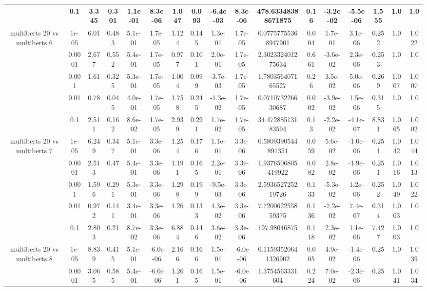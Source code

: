 \begin{tabular}{|c|c|c|c|c|c|c|c|c|c|c|c|c|c|c|c|c|}
 & 0.1 & 3.345 & 0.301 & 1.1e-01 & 8.3e-06 & 1.047 & 0.093 & -6.4e-03 & 8.3e-06 & 478.63348388671875 & 0.16 & -3.2e-02 & -5.5e-06 & 1.555 & 1.0 & 1.0 \\
\hline
\multirow{5}{*}{multiberts 20 vs multiberts 6} & 1e-05 & 6.01 & 0.483 & 5.1e-01 & 1.7e-05 & 1.124 & 0.145 & 1.3e-01 & 1.7e-05 & 0.07757755368947901 & 0.004 & 1.7e-01 & 3.1e-06 & 0.252 & 1.0 & 1.022 \\
 & 0.0001 & 2.677 & 0.552 & 5.4e-01 & 1.7e-05 & 0.977 & 0.101 & 2.0e-01 & 1.7e-05 & 2.302332401275634 & 0.661 & -3.6e-02 & 2.3e-06 & 0.253 & 1.0 & 1.0 \\
 & 0.001 & 1.61 & 0.325 & 5.3e-01 & 1.7e-05 & 1.004 & 0.099 & -3.7e-03 & 1.7e-05 & 1.780356407165527 & 0.26 & 3.5e-02 & 5.0e-06 & 0.269 & 1.007 & 1.007 \\
 & 0.01 & 0.78 & 0.045 & 4.0e-01 & 1.7e-05 & 1.758 & 0.245 & -1.3e-02 & 1.7e-05 & 0.071073226630687 & 0.002 & -3.9e-02 & 1.5e-06 & 0.315 & 1.0 & 1.0 \\
 & 0.1 & 2.511 & 0.162 & 8.6e-02 & 1.7e-05 & 2.939 & 0.291 & 1.7e-02 & 1.7e-05 & 34.47288513183594 & 0.13 & -2.2e-02 & -4.1e-07 & 8.831 & 1.065 & 1.002 \\
\hline
\multirow{5}{*}{multiberts 20 vs multiberts 7} & 1e-05 & 6.249 & 0.347 & 5.1e-01 & 3.3e-06 & 1.254 & 0.176 & 1.1e-01 & 3.3e-06 & 0.5809390544891351 & 0.059 & 5.6e-02 & -1.0e-06 & 0.251 & 1.042 & 1.044 \\
 & 0.0001 & 2.513 & 0.47 & 5.4e-01 & 3.3e-06 & 1.191 & 0.165 & 2.2e-01 & 3.3e-06 & 1.9376506805419922 & 0.082 & 2.8e-02 & -1.9e-06 & 0.251 & 1.016 & 1.013 \\
 & 0.001 & 1.596 & 0.291 & 5.3e-01 & 3.3e-06 & 1.298 & 0.199 & -9.5e-03 & 3.3e-06 & 2.593652725219726 & 0.133 & -5.3e-02 & 1.2e-06 & 0.252 & 1.049 & 1.022 \\
 & 0.01 & 0.972 & 0.141 & 3.4e-01 & 3.3e-06 & 1.26 & 0.133 & 4.3e-02 & 3.3e-06 & 7.720062255859375 & 0.136 & -7.2e-02 & 7.4e-07 & 0.314 & 1.003 & 1.0 \\
 & 0.1 & 2.803 & 0.21 & 8.7e-02 & 3.3e-06 & 6.884 & 0.146 & 3.6e-02 & 3.3e-06 & 197.98046875 & 0.118 & 2.3e-02 & 1.1e-06 & 7.427 & 1.003 & 1.0 \\
\hline
\multirow{5}{*}{multiberts 20 vs multiberts 8} & 1e-05 & 8.839 & 0.415 & 5.1e-01 & -6.0e-06 & 2.166 & 0.166 & 1.5e-01 & -6.0e-06 & 0.11593520641326902 & 0.005 & 4.9e-02 & -1.4e-06 & 0.25 & 1.0 & 1.039 \\
 & 0.0001 & 3.065 & 0.585 & 5.4e-01 & -6.0e-06 & 1.261 & 0.165 & 1.5e-01 & -6.0e-06 & 1.3754563331604 & 0.224 & 7.0e-02 & -2.3e-06 & 0.25 & 1.041 & 1.034 \\

\end{tabular}
